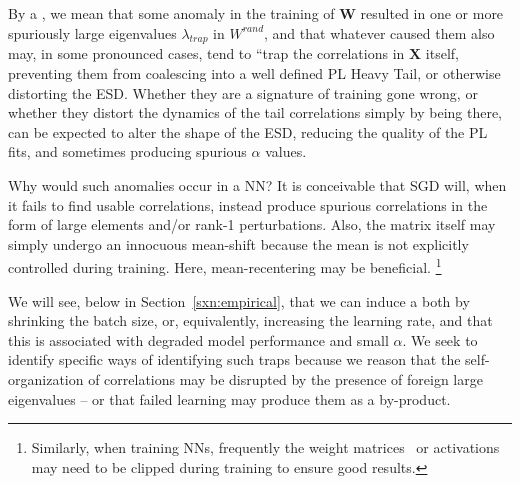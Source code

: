 By a \emph{\CorrelationTrap}, we mean that some anomaly in the training of $\mathbf{W}$ resulted
in one or more spuriously large eigenvalues $\lambda_{trap}$ in $W^{rand}$,
and that  whatever caused them also may, in some pronounced cases, tend
to ``trap the correlations in $\mathbf{X}$ itself,
preventing them from coalescing into a well defined PL Heavy Tail,
or otherwise distorting the ESD.
Whether they are a signature of training gone wrong, or whether they distort the dynamics of the tail correlations 
simply by being there, \CorrelationTraps can be expected to alter the shape of the ESD,
reducing the quality of the PL fits, and sometimes producing spurious $\alpha$ values.

Why would such anomalies  occur in a NN?
It is conceivable that SGD will, when it fails to find usable correlations, instead
produce spurious
correlations in the form of large elements and/or rank-1 perturbations.
Also, the matrix itself may simply undergo an innocuous  mean-shift because the
mean is not explicitly controlled during training. Here,  mean-recentering may be beneficial.
\footnote{Similarly, when training NNs, frequently the weight matrices~\cite{baskin2021} or activations~\cite{choi2018_TR}
may need to be clipped during training to ensure good results.}

We will see, below in Section~\ref{sxn:empirical}, that we can induce a \CorrelationTrap both by shrinking the batch 
size, or, equivalently, increasing the learning rate, and that this is associated with degraded model performance
and small $\alpha$.
We seek to identify specific ways of identifying such traps because we 
reason that the self-organization of correlations may be disrupted by the presence of foreign large eigenvalues – or that failed learning may produce them as a by-product.




